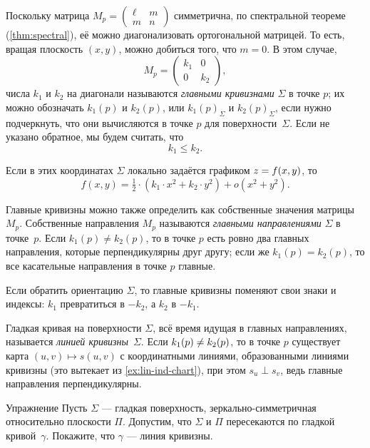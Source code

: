 Поскольку матрица $M_p=\left(\begin{smallmatrix}
 \ell
 &m
 \\
 m
 &n
 \end{smallmatrix}\right)$ 
симметрична, по спектральной теореме (\ref{thm:spectral}), её можно диагонализовать ортогональной матрицей.
То есть, вращая плоскость $(x,y)$, можно добиться того, что $m=0$.
В этом случае,
\[M_p=\begin{pmatrix}
 k_1
 &0
 \\
 0
 &k_2
 \end{pmatrix},
\]
числа $k_1$ и $k_2$  на диагонали называются \emph{главными кривизнами} $\Sigma$ в точке $p$;
их можно обозначать $k_1(p)$ и $k_2(p)$, или $k_1(p)_\Sigma$ и $k_2(p)_\Sigma$, если нужно подчеркнуть, что они вычисляются в точке $p$ для поверхности~$\Sigma$.
Если не указано обратное, мы будем считать, что 
\[k_1\le k_2.\]

{\sloppy

Если в этих координатах $\Sigma$ локально задаётся графиком $z\z=f(x,y)$, то 
\[f(x,y)=\tfrac12\cdot(k_1\cdot x^2+k_2\cdot y^2)+o(x^2+y^2).\]

}

Главные кривизны можно также определить как собственные значения матрицы $M_p$.
Собственные направления $M_p$ называются {}\emph{главными направлениями} $\Sigma$ в точке~$p$.
Если $k_1(p)\ne k_2(p)$, то в точке $p$ есть ровно два главных направления, которые перпендикулярны друг другу;
если же $k_1(p) = k_2(p)$, то все касательные направления в точке $p$ главные.

Если обратить ориентацию $\Sigma$, то главные кривизны поменяют свои знаки и индексы:
$k_1$ превратиться в $-k_2$, а $k_2$ в $-k_1$.

Гладкая кривая на поверхности $\Sigma$, всё время идущая в главных направлениях, называется \emph{линией кривизны}~$\Sigma$.
Если $k_1(p)\z\ne k_2(p)$, то в точке $p$ существует карта $(u,v)\mapsto s(u,v)$ с координатными линиями, образованными линиями кривизны (это вытекает из \ref{ex:lin-ind-chart}), при этом $s_u\perp s_v$, ведь главные направления перпендикулярны.

\begin{thm}{Упражнение}\label{ex:line-of-curvature}
Пусть $\Sigma$ --- гладкая поверхность, зеркально-симметричная относительно плоскости $\Pi$.
Допустим, что $\Sigma$ и $\Pi$ пересекаются по гладкой кривой~$\gamma$.
Покажите, что $\gamma$ --- линия кривизны.
\end{thm}


